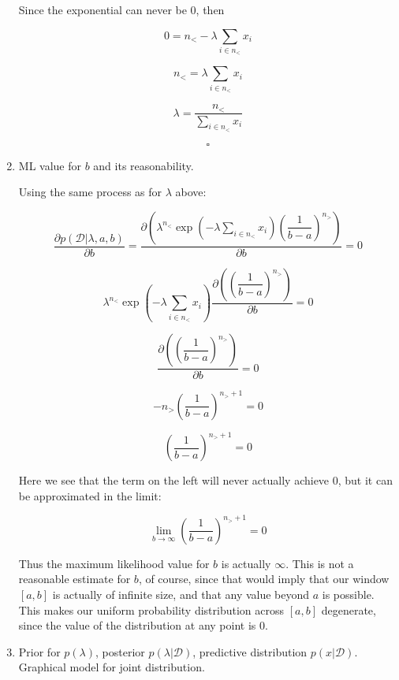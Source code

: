 \documentclass[11pt]{article}
\begin{document}
\begin{enumerate}[label=\textbf{\alph*.}]
        Since the exponential can never be $0$, then

        $$
        0 = n_< - \lambda \sum_{i \in n_<} x_i
        $$

        $$
        n_< = \lambda \sum_{i \in n_<} x_i
        $$

        $$
        \lambda  = \dfrac{n_<}{\sum_{i \in n_<} x_i}
        $$

        $$\square$$

    \item ML value for $b$ and its reasonability.

        Using the same process as for $\lambda$ above:

        $$
        \dfrac{\partial p(\mathcal{D} | \lambda, a, b)}{\partial b} = \dfrac{\partial (\lambda^{n_<} \exp (-\lambda \sum_{i \in n_<} x_i) (\dfrac{1}{b - a})^{n_>})}{\partial b} = 0
        $$

        $$
        \lambda^{n_<} \exp (-\lambda \sum_{i \in n_<} x_i) \dfrac{\partial ((\dfrac{1}{b - a})^{n_>})}{\partial b} = 0
        $$

        $$
        \dfrac{\partial ((\dfrac{1}{b - a})^{n_>})}{\partial b} = 0
        $$

        $$
        - n_> (\dfrac{1}{b - a})^{n_> + 1} = 0
        $$

        $$
        (\dfrac{1}{b - a})^{n_> + 1} = 0
        $$

        Here we see that the term on the left will never actually achieve $0$, but it can be approximated in the limit:

        $$
        \lim_{b \rightarrow \infty} (\dfrac{1}{b - a})^{n_> + 1} = 0
        $$

        Thus the maximum likelihood value for $b$ is actually $\infty$. This is not a reasonable estimate for $b$, of course, since that would imply that our window $[a,b]$ is actually of infinite size, and that any value beyond $a$ is possible. This makes our uniform probability distribution across $[a,b]$ degenerate, since the value of the distribution at any point is $0$.

    \item Prior for $p(\lambda)$, posterior $p(\lambda|\mathcal{D})$, predictive distribution $p(x|\mathcal{D})$. Graphical model for joint distribution.


\end{enumerate}
\end{document}
